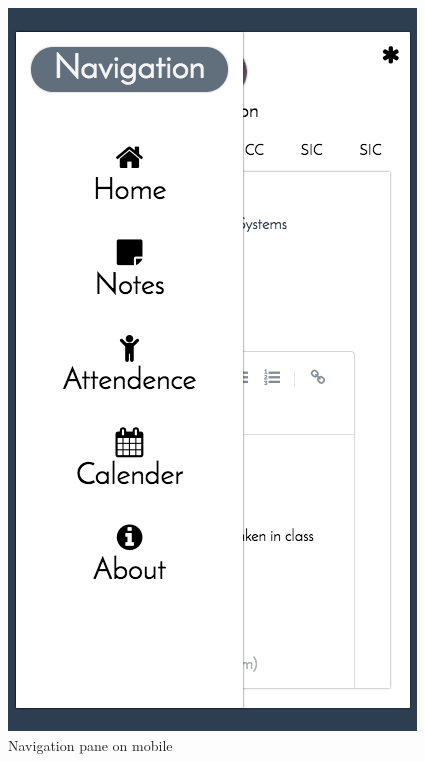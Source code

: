 \documentclass{article}
\begin{document}
\begin{figure}
  \includegraphics[width=\linewidth]{mobilenav.png}
  \caption{Navigation pane on mobile}
\end{figure}
\end{document}
